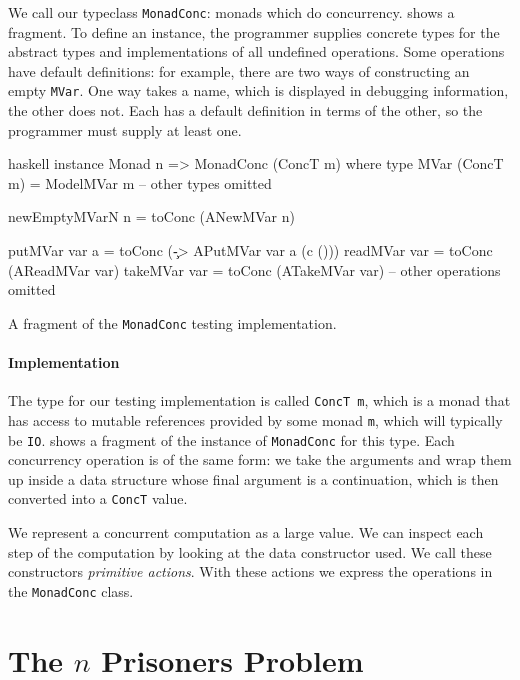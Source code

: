 We call our typeclass \verb|MonadConc|: monads which do concurrency.
 shows a fragment.  To define an instance, the
programmer supplies concrete types for the abstract types and
implementations of all undefined operations.  Some operations have
default definitions: for example, there are two ways of constructing
an empty \verb|MVar|.  One way takes a name, which is displayed in
debugging information, the other does not.  Each has a default
definition in terms of the other, so the programmer must supply at
least one.

\begin{listing}
\centering
\begin{cminted}{haskell}
instance Monad n => MonadConc (ConcT m) where
  type MVar (ConcT m) = ModelMVar m
  -- other types omitted

  newEmptyMVarN n = toConc (ANewMVar n)

  putMVar  var a = toConc (\c -> APutMVar var a (c ()))
  readMVar var   = toConc (AReadMVar var)
  takeMVar var   = toConc (ATakeMVar var)
  -- other operations omitted
\end{cminted}
\caption{A fragment of the \texttt{MonadConc} testing implementation.}\label{lst:mvarops}
\end{listing}

\paragraph{Implementation}
The type for our testing implementation is called \verb|ConcT m|,
which is a monad that has access to mutable references provided by
some monad \verb|m|, which will typically be \verb|IO|.
 shows a fragment of the instance of
\verb|MonadConc| for this type.  Each concurrency operation is of the
same form: we take the arguments and wrap them up inside a data
structure whose final argument is a continuation, which is then
converted into a \verb|ConcT| value.

We represent a concurrent computation as a large value.  We can
inspect each step of the computation by looking at the data
constructor used.  We call these constructors \emph{primitive
  actions}.  With these actions we express the operations in the
\verb|MonadConc| class.

\section{The $n$ Prisoners Problem}
\label{sec:dejafu-100}

